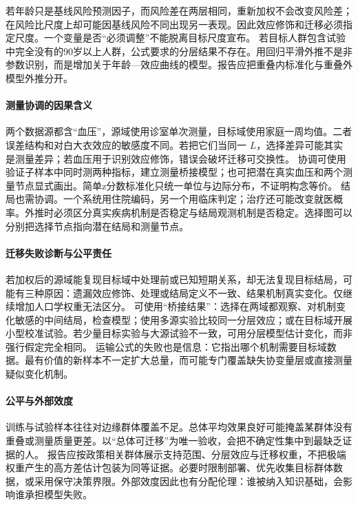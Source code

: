 若年龄只是基线风险预测因子，而风险差在两层相同，重新加权不会改变风险差；在风险比尺度上却可能因基线风险不同出现另一表现。因此效应修饰和迁移必须指定尺度。一个变量是否“必须调整”不能脱离目标尺度宣布。
若目标人群包含试验中完全没有的90岁以上人群，公式要求的分层结果不存在。用回归平滑外推不是非参数识别，而是增加关于年龄---效应曲线的模型。报告应把重叠内标准化与重叠外模型外推分开。

\paragraph{测量协调的因果含义}

两个数据源都含“血压”，源域使用诊室单次测量，目标域使用家庭一周均值。二者误差结构和对白大衣效应的敏感度不同。若把它们当同一 $L$，选择差异可能其实是测量差异；若血压用于识别效应修饰，错误会破坏迁移可交换性。
协调可使用验证子样本中同时测两种指标，建立测量桥接模型；也可把潜在真实血压和两个测量节点显式画出。简单z分数标准化只统一单位与边际分布，不证明构念等价。
结局也需协调。一个系统用住院编码，另一个用临床判定；治疗还可能改变就医概率。外推时必须区分真实疾病机制是否稳定与结局观测机制是否稳定。选择图可以分别把选择节点指向潜在结局和测量节点。

\paragraph{迁移失败诊断与公平责任}

若加权后的源域能复现目标域中处理前或已知短期关系，却无法复现目标结局，可能有三种原因：遗漏效应修饰、处理或结局定义不一致、结果机制真实变化。仅继续增加人口学权重无法区分。
可使用“桥接结果”：选择在两域都观察、对机制变化敏感的中间结局，检查模型；使用多源实验比较同一分层效应；或在目标域开展小型校准试验。若少量目标实验与大源试验不一致，可用分层模型估计变化，而非强行假定完全相同。
运输公式的失败也是信息：它指出哪个机制需要目标域数据。最有价值的新样本不一定扩大总量，而可能专门覆盖缺失协变量层或直接测量疑似变化机制。

\paragraph{公平与外部效度}

训练与试验样本往往对边缘群体覆盖不足。总体平均效果良好可能掩盖某群体没有重叠或测量质量更差。以“总体可迁移”为唯一验收，会把不确定性集中到最缺乏证据的人。
报告应按政策相关群体展示支持范围、分层效应与迁移权重，不把极端权重产生的高方差估计包装为同等证据。必要时限制部署、优先收集目标群体数据，或采用保守决策界限。外部效度因此也有分配伦理：谁被纳入知识基础，会影响谁承担模型失败。

